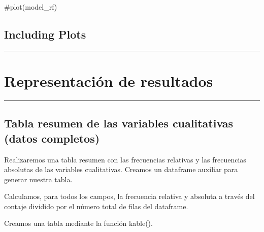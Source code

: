 \documentclass[
]{article}
\newenvironment{Shaded}{\begin{snugshade}}{\end{snugshade}}
\newcommand{\CommentTok}[1]{\textcolor[rgb]{0.50,0.62,0.50}{#1}}
\begin{document}
\begin{Shaded}
\begin{Highlighting}[]
\CommentTok{#plot(model_rf)}
\end{Highlighting}
\end{Shaded}

\hypertarget{including-plots}{%
\subsection{Including Plots}\label{including-plots}}

\begin{center}\rule{0.5\linewidth}{0.5pt}\end{center}

\hypertarget{representaciuxf3n-de-resultados}{%
\section{\texorpdfstring{\textbf{Representación de
resultados}}{Representación de resultados}}\label{representaciuxf3n-de-resultados}}

\begin{center}\rule{0.5\linewidth}{0.5pt}\end{center}

\hypertarget{tabla-resumen-de-las-variables-cualitativas-datos-completos}{%
\subsection{Tabla resumen de las variables cualitativas (datos
completos)}\label{tabla-resumen-de-las-variables-cualitativas-datos-completos}}

Realizaremos una tabla resumen con las frecuencias relativas y las
frecuencias absolutas de las variables cualitativas. Creamos un
dataframe auxiliar para generar nuestra tabla.

Calculamos, para todos los campos, la frecuencia relativa y absoluta a
través del contaje dividido por el número total de filas del dataframe.

Creamos una tabla mediante la función kable().
\end{document}

